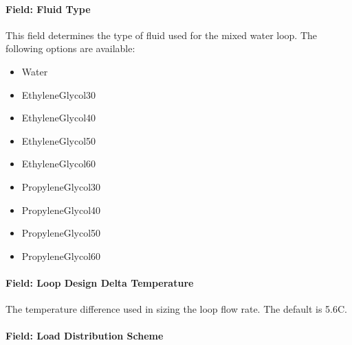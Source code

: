 \paragraph{Field: Fluid Type}\label{field-fluid-type-2}

This field determines the type of fluid used for the mixed water loop. The following options are available:

\begin{itemize}
\item
  Water
\item
  EthyleneGlycol30
\item
  EthyleneGlycol40
\item
  EthyleneGlycol50
\item
  EthyleneGlycol60
\item
  PropyleneGlycol30
\item
  PropyleneGlycol40
\item
  PropyleneGlycol50
\item
  PropyleneGlycol60
\end{itemize}

\paragraph{Field: Loop Design Delta Temperature}\label{field-loop-design-delta-temperature-2}

The temperature difference used in sizing the loop flow rate. The default is 5.6C.

\paragraph{Field: Load Distribution Scheme}\label{field-load-distribution-scheme-1}

